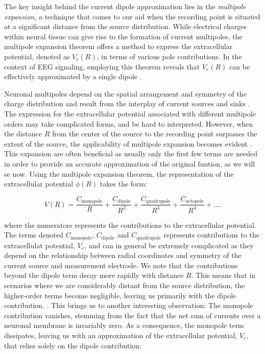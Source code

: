 \documentclass[a4paper, UKenglish, 11pt]{uiomaster}
\begin{document}
The key insight behind the current dipole approximation lies in the \emph{multipole expansion}, a technique that comes to our aid when the recording point is situated at a significant distance from the source distribution. While electrical charges within neural tissue can give rise to the formation of current multipoles, the multipole expansion theorem offers a method to express the extracellular potential, denoted as $V_e(R)$, in terms of various pole contributions. In the context of EEG signaling, employing this theorem reveals that $V_e(R)$ can be effectively approximated by a single dipole \cite{wiki:multipoles}. 

Neuronal multipoles depend on the spatial arrangement and symmetry of the charge distribution and result from the interplay of current sources and sinks \cite{wiki:multipoles}. The expression for the extracellular potential associated with different multipole orders may take complicated forms, and be hard to interpreted. However, when the distance $R$ from the center of the source to the recording point surpasses the extent of the source, the applicability of multipole expansion becomes evident \cite{jackson1999classical} . This expansion are often beneficial as usually only the first few terms are needed in order to provide an accurate approximation of the original funtion, as we will se now. Using the multipole expansion theorem, the representation of the extracellular potential $\phi(R)$ takes the form:

\begin{equation}
  V(R) = \frac{C_{\text{monopole}}}{R} + \frac{C_{\text{dipole}}}{R^2} + \frac{C_{\text{quadrupole}}}{R^3} + \frac{C_{\text{octopole}}}{R^4} + ... .
\label{eq:extracellular_potential}
\end{equation}

where the numerators represents the contributions to the extracellular potential. The terms denoted $C_\text{monopole}$, $C_\text{dipole}$ and $C_\text{quadrupole}$ represents contributions to the extracellulat potential, $V_e$, and can in general be extremely complicated as they depend on the relationship between radial coordinates and symmetry of the current source and measurement electrode. We note that the contributions beyond the dipole term decay more rapidly with distance $R$. This means that in scenarios where we are considerably distant from the source distribution, the higher-order terms become negligible, leaving us primarily with the dipole contribution. . This brings us to another interesting observation: The monopole contribution vanishes, stemming from the fact that the net sum of currents over a neuronal membrane is invariably zero. As a consequence, the monopole term dissipates, leaving us with an approximation of the extracellular potential, $V_e$, that relies solely on the dipole contribution:
\end{document}
